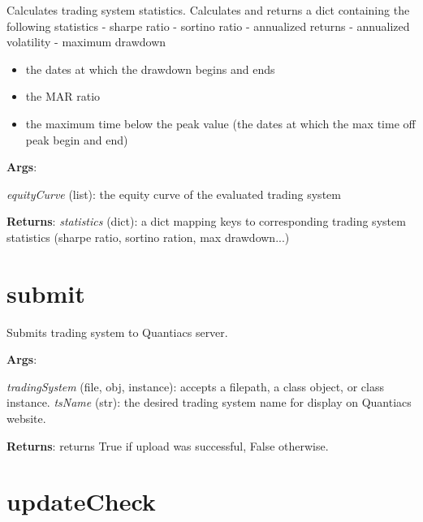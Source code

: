 \documentclass[letterpaper,10pt,english]{sphinxmanual}
\begin{document}
Calculates trading system statistics. Calculates and returns a dict containing the following statistics - sharpe ratio - sortino ratio - annualized returns - annualized volatility - maximum drawdown
\begin{itemize}
\item {} 
the dates at which the drawdown begins and ends

\item {} 
the MAR ratio

\item {} 
the maximum time below the peak value (the dates at which the max time off peak begin and end)

\end{itemize}

\textbf{Args}:

\emph{equityCurve} (list): the equity curve of the evaluated trading system

\textbf{Returns}:
\emph{statistics} (dict): a dict mapping keys to corresponding trading system statistics (sharpe ratio, sortino ration, max drawdown...)


\section{submit}
\label{reference:submit}

\begin{fulllineitems}
\label{reference:quantiacsToolbox.submit}
\end{fulllineitems}


Submits trading system to Quantiacs server.

\textbf{Args}:

\emph{tradingSystem} (file, obj, instance): accepts a filepath, a class object, or class instance.
\emph{tsName} (str): the desired trading system name for display on Quantiacs website.

\textbf{Returns}:
returns True if upload was successful, False otherwise.


\section{updateCheck}
\label{reference:updatecheck}

\begin{fulllineitems}
\label{reference:quantiacsToolbox.updateCheck}
\end{fulllineitems}
\end{document}
